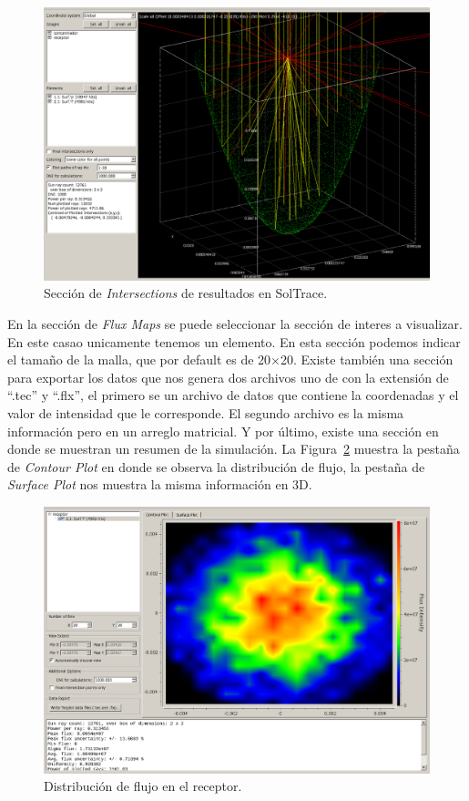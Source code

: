 \begin{figure}[ht]
  \centering
  \includegraphics[width=1.0\textwidth]{figures/intersecciones}
  \caption{\label{fig:inter}  Sección de \emph{Intersections} de resultados en SolTrace.}
\end{figure}


En la sección de \emph{Flux Maps} se puede seleccionar la sección de interes a visualizar. En este casao unicamente tenemos un elemento. En esta sección podemos indicar el tamaño de la malla, que por default es de 20$\times$20. Existe también una sección para exportar los datos que nos genera dos archivos uno de con la extensión de ``.tec'' y ``.flx'', el primero se un archivo de datos que contiene la coordenadas y el valor de intensidad que le corresponde. El segundo archivo es la misma información pero en un arreglo matricial. Y por último, existe una sección en donde se muestran un resumen de la simulación. La Figura~\ref{fig:flux} muestra la pestaña de \emph{Contour Plot} en donde se observa la distribución de flujo, la pestaña de \emph{Surface Plot} nos muestra la misma información en 3D.

\begin{figure}[ht]
  \centering
  \includegraphics[width=1.0\textwidth]{figures/flux}
  \caption{\label{fig:flux} Distribución de flujo en el receptor.}
\end{figure}


